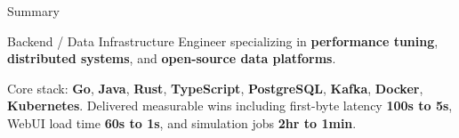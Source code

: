 \documentclass[
	11pt, %
]{resume} %
\begin{document}

\begin{rSection}{Summary}
\begin{rSubsection}{}{}{}{}
            \item Backend / Data Infrastructure Engineer specializing in \textbf{performance tuning}, \textbf{distributed systems}, and \textbf{open-source data platforms}.
            \item Core stack: \textbf{Go}, \textbf{Java}, \textbf{Rust}, \textbf{TypeScript}, \textbf{PostgreSQL}, \textbf{Kafka}, \textbf{Docker}, \textbf{Kubernetes}. Delivered measurable wins including first-byte latency \textbf{100s to 5s}, WebUI load time \textbf{60s to 1s}, and simulation jobs \textbf{2hr to 1min}.
	\end{rSubsection}
\end{rSection}

\end{document}
